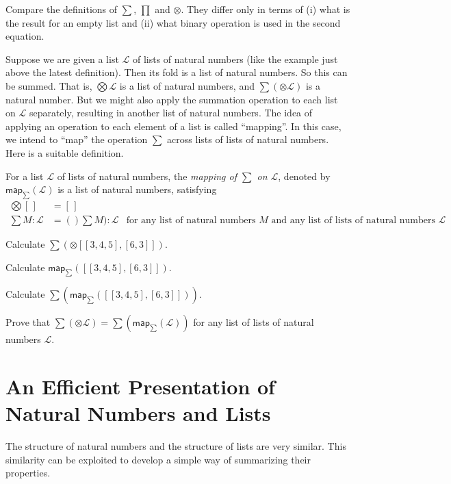 Compare the definitions of $\sum$, $\prod$ and $\otimes$. They differ only in terms of (i) what is the result for an empty list
and (ii) what binary operation is used in the second equation.

Suppose we are given a list $\mathcal L$ of lists of natural numbers (like the example just above the latest definition). Then its fold is a list of natural numbers. So this can be summed. That is, $\bigotimes \mathcal L$ is a list of natural numbers, and $\sum(\otimes \mathcal L)$ is a natural number. But we might also apply the summation operation to each list on $\mathcal L$ separately, resulting in another list of natural numbers.
The idea of applying an operation to each element of a list is called ``mapping''. In this case, we intend to ``map'' the operation $\sum$
across lists of lists of natural numbers. Here is a suitable definition.

\newcommand{\map}{\mathord{\textsf{map}}}
\begin{defn}
	For a list $\mathcal L$ of lists of natural numbers, the \emph{mapping of $\sum$ on $\mathcal L$}, denoted by $\map_\sum(\mathcal L)$
	is a list of natural numbers, satisfying
	\begin{align*}
	\bigotimes[\,] &= [\,]\\
	\sum M:\mathcal L &= ()\sum M): \mathcal L &\text{for any list of natural numbers $M$ and any list of lists of natural numbers $\mathcal L$}
	\end{align*}
\end{defn}

\begin{exercises}
	\item Calculate $\sum(\otimes[[3,4,5],[6,3]])$.
	\item Calculate $\map_\sum([[3,4,5],[6,3]])$.
	\item Calculate $\sum(\map_\sum([[3,4,5],[6,3]]))$.
	\item Prove that $\sum(\otimes\mathcal L) = \sum(\map_\sum(\mathcal L))$ for any list of lists of natural numbers $\mathcal L$.
\end{exercises}

\section{An Efficient Presentation of Natural Numbers and Lists}

The structure of natural numbers and the structure of lists are very similar. This similarity can be exploited to 
develop a simple way of summarizing their properties.

